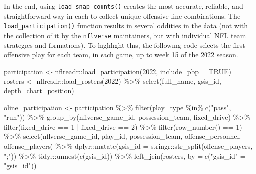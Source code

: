 \documentclass[
  letterpaper,
]{krantz}
\newenvironment{Shaded}{\begin{snugshade}}{\end{snugshade}}
\newcommand{\AttributeTok}[1]{\textcolor[rgb]{0.40,0.45,0.13}{#1}}
\newcommand{\ConstantTok}[1]{\textcolor[rgb]{0.56,0.35,0.01}{#1}}
\newcommand{\DecValTok}[1]{\textcolor[rgb]{0.68,0.00,0.00}{#1}}
\newcommand{\FunctionTok}[1]{\textcolor[rgb]{0.28,0.35,0.67}{#1}}
\newcommand{\NormalTok}[1]{\textcolor[rgb]{0.00,0.23,0.31}{#1}}
\newcommand{\OtherTok}[1]{\textcolor[rgb]{0.00,0.23,0.31}{#1}}
\newcommand{\SpecialCharTok}[1]{\textcolor[rgb]{0.37,0.37,0.37}{#1}}
\newcommand{\StringTok}[1]{\textcolor[rgb]{0.13,0.47,0.30}{#1}}
\begin{document}
In the end, using \texttt{load\_snap\_counts()} creates the most
accurate, reliable, and straightforward way in each to collect unique
offensive line combinations. The \texttt{load\_participation()} function
results in several oddities in the data (not with the collection of it
by the \texttt{nflverse} maintainers, but with individual NFL team
strategies and formations). To highlight this, the following code
selects the first offensive play for each team, in each game, up to week
15 of the 2022 season.

\begin{Shaded}
\begin{Highlighting}[]
\NormalTok{participation }\OtherTok{\textless{}{-}}\NormalTok{ nflreadr}\SpecialCharTok{::}\FunctionTok{load\_participation}\NormalTok{(}\DecValTok{2022}\NormalTok{, }\AttributeTok{include\_pbp =} \ConstantTok{TRUE}\NormalTok{)}
\NormalTok{rosters }\OtherTok{\textless{}{-}}\NormalTok{ nflreadr}\SpecialCharTok{::}\FunctionTok{load\_rosters}\NormalTok{(}\DecValTok{2022}\NormalTok{) }\SpecialCharTok{\%\textgreater{}\%}
  \FunctionTok{select}\NormalTok{(full\_name, gsis\_id, depth\_chart\_position)}

\NormalTok{oline\_participation }\OtherTok{\textless{}{-}}\NormalTok{ participation }\SpecialCharTok{\%\textgreater{}\%}
  \FunctionTok{filter}\NormalTok{(play\_type }\SpecialCharTok{\%in\%} \FunctionTok{c}\NormalTok{(}\StringTok{"pass"}\NormalTok{, }\StringTok{"run"}\NormalTok{)) }\SpecialCharTok{\%\textgreater{}\%}
  \FunctionTok{group\_by}\NormalTok{(nflverse\_game\_id, possession\_team, fixed\_drive) }\SpecialCharTok{\%\textgreater{}\%}
  \FunctionTok{filter}\NormalTok{(fixed\_drive }\SpecialCharTok{==} \DecValTok{1} \SpecialCharTok{|}\NormalTok{ fixed\_drive }\SpecialCharTok{==} \DecValTok{2}\NormalTok{) }\SpecialCharTok{\%\textgreater{}\%}
  \FunctionTok{filter}\NormalTok{(}\FunctionTok{row\_number}\NormalTok{() }\SpecialCharTok{==} \DecValTok{1}\NormalTok{) }\SpecialCharTok{\%\textgreater{}\%}
  \FunctionTok{select}\NormalTok{(nflverse\_game\_id, play\_id, possession\_team, }
\NormalTok{         offense\_personnel, offense\_players) }\SpecialCharTok{\%\textgreater{}\%}
\NormalTok{  dplyr}\SpecialCharTok{::}\FunctionTok{mutate}\NormalTok{(}\AttributeTok{gsis\_id =}\NormalTok{ stringr}\SpecialCharTok{::}\FunctionTok{str\_split}\NormalTok{(offense\_players, }\StringTok{";"}\NormalTok{)) }\SpecialCharTok{\%\textgreater{}\%}
\NormalTok{  tidyr}\SpecialCharTok{::}\FunctionTok{unnest}\NormalTok{(}\FunctionTok{c}\NormalTok{(gsis\_id)) }\SpecialCharTok{\%\textgreater{}\%}
  \FunctionTok{left\_join}\NormalTok{(rosters, }\AttributeTok{by =} \FunctionTok{c}\NormalTok{(}\StringTok{"gsis\_id"} \OtherTok{=} \StringTok{"gsis\_id"}\NormalTok{))}


\end{Highlighting}
\end{Shaded}
\end{document}
